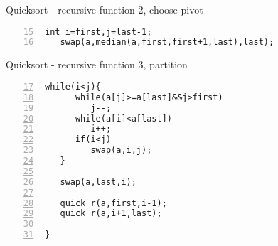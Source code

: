 \documentclass{beamer}
\begin{document}
\begin{frame}[fragile]{Quicksort - recursive function 2, choose pivot}
\begin{lstlisting}[numbers=left,firstnumber=15]
   int i=first,j=last-1;
   swap(a,median(a,first,first+1,last),last);
\end{lstlisting}
\end{frame}
\begin{frame}[fragile]{Quicksort - recursive function 3, partition}
\begin{lstlisting}[numbers=left,firstnumber=17]
   while(i<j){
      while(a[j]>=a[last]&&j>first)
         j--;
      while(a[i]<a[last])
         i++;
      if(i<j)
         swap(a,i,j);
   }

   swap(a,last,i);

   quick_r(a,first,i-1);
   quick_r(a,i+1,last);

}
\end{lstlisting}
\end{frame}
\end{document}
